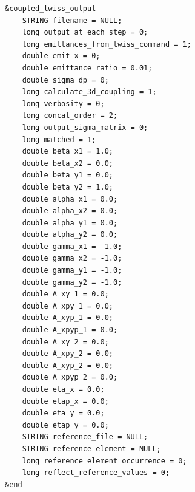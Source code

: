 \documentclass[11pt]{article}
\begin{document}
\begin{verbatim}
&coupled_twiss_output
    STRING filename = NULL;
    long output_at_each_step = 0;
    long emittances_from_twiss_command = 1;
    double emit_x = 0;
    double emittance_ratio = 0.01;
    double sigma_dp = 0;
    long calculate_3d_coupling = 1;
    long verbosity = 0;
    long concat_order = 2;
    long output_sigma_matrix = 0;
    long matched = 1;
    double beta_x1 = 1.0;
    double beta_x2 = 0.0;
    double beta_y1 = 0.0;
    double beta_y2 = 1.0;
    double alpha_x1 = 0.0;
    double alpha_x2 = 0.0;
    double alpha_y1 = 0.0;
    double alpha_y2 = 0.0;
    double gamma_x1 = -1.0;
    double gamma_x2 = -1.0;
    double gamma_y1 = -1.0;
    double gamma_y2 = -1.0;
    double A_xy_1 = 0.0;
    double A_xpy_1 = 0.0;
    double A_xyp_1 = 0.0;
    double A_xpyp_1 = 0.0;
    double A_xy_2 = 0.0;
    double A_xpy_2 = 0.0;
    double A_xyp_2 = 0.0;
    double A_xpyp_2 = 0.0;
    double eta_x = 0.0;
    double etap_x = 0.0;
    double eta_y = 0.0;
    double etap_y = 0.0;
    STRING reference_file = NULL;
    STRING reference_element = NULL;
    long reference_element_occurrence = 0;
    long reflect_reference_values = 0;
&end
\end{verbatim}
\end{document}
